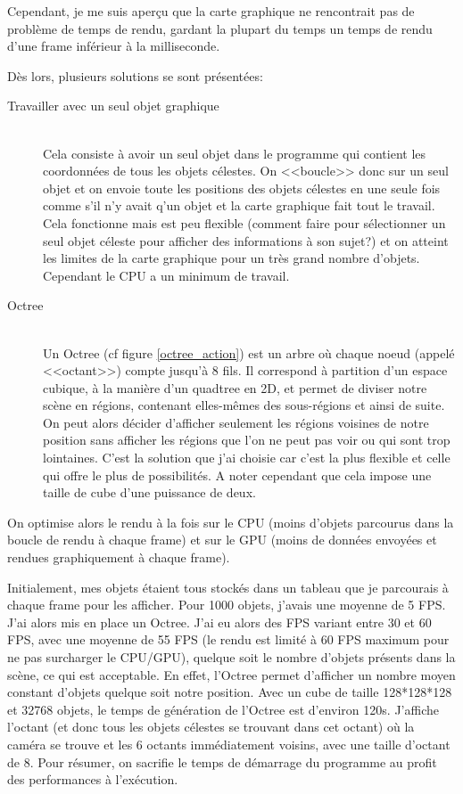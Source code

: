 \documentclass[a4paper,french,12pt]{article}
\begin{document}
		  Cependant, je me suis aperçu que la carte graphique ne rencontrait pas de problème de temps de rendu,
		  gardant la plupart du temps un temps de rendu d'une frame inférieur à la milliseconde.

		  Dès lors, plusieurs solutions se sont présentées:

		  \begin{description}
		  \item [Travailler avec un seul objet graphique]~\\ Cela consiste à avoir un seul objet dans le programme qui
		  contient les coordonnées de tous les objets célestes. On <<boucle>> donc sur un seul objet et on envoie toute
		  les positions des objets célestes en une seule fois comme s'il n'y avait q'un objet et la carte
		  graphique fait tout le travail. Cela fonctionne mais est peu flexible (comment faire pour sélectionner
		  un seul objet céleste pour afficher des informations à son sujet?) et on atteint les limites de la
		  carte graphique pour un très grand nombre d'objets. Cependant le CPU a un minimum de travail.

		  \item [Octree]~\\ Un Octree (cf figure \ref{octree_action}) est un arbre où chaque noeud (appelé <<octant>>) compte jusqu'à 8 fils. Il correspond à partition
		  d'un espace cubique, à la manière d'un quadtree en 2D, et permet de diviser notre scène en régions,
		  contenant elles-mêmes des sous-régions et ainsi de suite. On peut alors décider d'afficher seulement les
		  régions voisines de notre position sans afficher les régions que l'on ne peut pas voir ou qui sont
		  trop lointaines. C'est la solution que j'ai choisie car c'est la plus flexible et celle qui offre le
		  plus de possibilités. A noter cependant que cela impose une taille de cube d'une puissance de deux.

		  \FloatBarrier
		\end{description}


		On optimise alors le rendu à la fois sur le CPU (moins d'objets parcourus dans la boucle
			      de rendu à chaque frame) et sur le GPU (moins de données envoyées et
			      rendues graphiquement à chaque frame).


		Initialement, mes objets étaient tous stockés dans un tableau que je parcourais à chaque frame pour les afficher.
		Pour 1000 objets, j'avais une moyenne de 5 FPS.
		J'ai alors mis en place un Octree. J'ai eu alors des FPS variant entre 30 et 60 FPS, avec une moyenne de 55 FPS
		(le rendu est limité à 60 FPS maximum
		pour ne pas surcharger le CPU/GPU), quelque soit le nombre d'objets présents dans la scène, ce qui est acceptable.
		En effet, l'Octree permet d'afficher un nombre moyen constant d'objets quelque soit notre position.
		Avec un cube de taille 128*128*128 et 32768 objets, le temps de génération de l'Octree est d'environ 120s.
		J'affiche l'octant (et donc tous les objets célestes se trouvant dans cet octant) où la caméra se trouve
		et les 6 octants immédiatement voisins, avec une taille d'octant de 8.
		Pour résumer, on sacrifie le temps de démarrage du programme au profit des performances à l'exécution.
\end{document}
